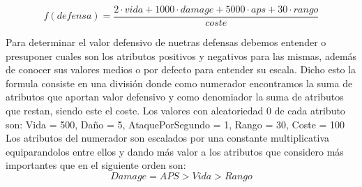 
$$f(defensa)=\frac{2\cdot vida+1000\cdot damage+5000\cdot aps+30\cdot rango}{coste} $$

Para determinar el valor defensivo de nuetras defensas debemos entender o presuponer cuales son los atributos positivos y negativos para las mismas, además de conocer sus valores medios o por defecto para entender su escala. 
Dicho esto la formula consiste en una división donde como numerador encontramos la suma de atributos que aportan valor defensivo y como denomiador la suma de atributos que restan, siendo este el coste.
Los valores con aleatoriedad 0 de cada atributo son:
Vida = 500, Daño = 5, AtaquePorSegundo = 1, Rango = 30, Coste = 100
Los atributos del numerador son escalados por una constante multiplicativa equiparandolos entre ellos y dando más valor a los atributos que considero más importantes que en el siguiente orden son:
$$ Damage= APS > Vida > Rango$$
